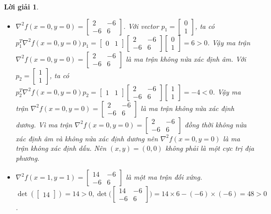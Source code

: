 \documentclass[14pt, a4paper]{article}
\theoremstyle{sltheorem}
\theoremstyle{soltheorem}
\newtheorem*{loigiai}{Lời giải}
\begin{document}
\begin{loigiai}
        \begin{itemize}
            \item $\nabla^2 f(x=0,y=0)=\begin{bmatrix} 2 & -6 \\ -6 & 6 \end{bmatrix}$. 
            Với vector $p_1 = \begin{bmatrix} 0 \\ 1\end{bmatrix}$, ta có $p_1^T \nabla^2 f(x=0,y=0) p_1=\begin{bmatrix} 0 & 1\end{bmatrix}\begin{bmatrix} 2 & -6 \\ -6 & 6 \end{bmatrix} \begin{bmatrix} 0 \\ 1\end{bmatrix}=6 > 0$. 
            Vậy ma trận $\nabla^2 f(x=0,y=0)=\begin{bmatrix} 2 & -6 \\ -6 & 6 \end{bmatrix}$ là ma trận không nửa xác định âm. 
            Với $p_2 = \begin{bmatrix} 1 \\ 1\end{bmatrix}$, ta có $p_2^T \nabla^2 f(x=0,y=0) p_2=\begin{bmatrix} 1 & 1\end{bmatrix}\begin{bmatrix} 2 & -6 \\ -6 & 6 \end{bmatrix} \begin{bmatrix} 1 \\ 1\end{bmatrix}=-4 < 0$.
            Vậy ma trận $\nabla^2 f(x=0,y=0)=\begin{bmatrix} 2 & -6 \\ -6 & 6 \end{bmatrix}$ là ma trận không nửa xác định dương.
            Vì ma trận $\nabla^2 f(x=0,y=0)=\begin{bmatrix} 2 & -6 \\ -6 & 6 \end{bmatrix}$ đồng thời không nửa xác định âm và không nửa xác định dương nên $\nabla^2 f(x=0,y=0)$ là ma trận không xác định dấu. 
            Nên $(x, y)=(0, 0)$ không phải là một cực trị địa phương.
            \item $\nabla^2 f(x=1,y=1)=\begin{bmatrix} 14 & -6 \\ -6 & 6 \end{bmatrix}$ là một ma trận đối xứng. $\det{(\begin{bmatrix}14\end{bmatrix})}=14>0, \det{\Big(\begin{bmatrix} 14 & -6 \\ -6 & 6 \end{bmatrix}\Big)}=14\times6 - (-6)\times(-6)=48>0$.

\end{itemize}
\end{loigiai}
\end{document}
